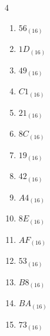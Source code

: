 \begin{multicols}{4}
\begin{enumerate}
        \phantom{$=189$}

  \item $56_{(16)}$

        \phantom{$=86$}

  \item $1D_{(16)}$

        \phantom{$=29$}

  \item $49_{(16)}$

        \phantom{$=73$}

  \item $C1_{(16)}$

        \phantom{$=193$}

  \item $21_{(16)}$

        \phantom{$=33$}

  \item $8C_{(16)}$

        \phantom{$=140$}

  \item $19_{(16)}$

        \phantom{$=25$}

  \item $42_{(16)}$

        \phantom{$=66$}

  \item $A4_{(16)}$

        \phantom{$=164$}

  \item $8E_{(16)}$

        \phantom{$=142$}

  \item $AF_{(16)}$

        \phantom{$=175$}

  \item $53_{(16)}$

        \phantom{$=83$}

\columnbreak %

  \item $B8_{(16)}$

        \phantom{$=184$}

  \item $BA_{(16)}$

        \phantom{$=186$}

  \item $73_{(16)}$

        \phantom{$=115$}


\end{enumerate}
\end{multicols}
